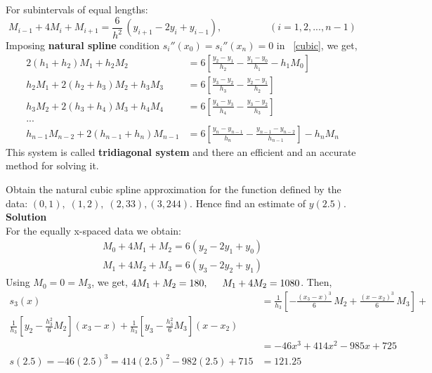 \documentclass[aima203_lecturenotes_ku.tex]{subfiles}
\begin{document}
For subintervals of equal lengths:
\begin{equation}
  M_{i-1} + 4 M_i + M_{i+1} = \frac{6}{h^2}\, (y_{i+1} -2y_i + y_{i-1}), \hspace{2cm} (i=1,2,...,n-1)
\end{equation}
Imposing \textbf{natural spline} condition $s_i''(x_0) = s_i''(x_n) = 0$ in ~\ref{cubic}, we get,
\begin{align*}
  2(h_1+h_2)M_1 + h_2M_2 &= 6 \left[ \frac{y_2 - y_1}{h_2} - \frac{y_1 -y_0}{h_1} - h_1 M_0 \right ]\\[1mm]
  h_2M_1 + 2(h_2 + h_3)M_2 + h_3M_3 &= 6 \left[ \frac{y_3 - y_2}{h_3} - \frac{y_2 -y_1}{h_2}\right ] \\[1mm]
  h_3M_2 + 2(h_3 + h_4)M_3 + h_4M_4 &= 6 \left[ \frac{y_4 - y_3}{h_4} - \frac{y_3 -y_2}{h_3}\right ] \\[1mm]
  ... \\[1mm]
  h_{n-1}M_{n-2} + 2(h_{n-1} + h_n)M_{n-1} &= 6 \left[ \frac{y_n - y_{n-1}}{h_n} - \frac{y_{n-1} -y_{n-2}}{h_{n-1}}\right ] - h_n M_n
\end{align*}
This system is called \textbf{tridiagonal system} and there an efficient and an accurate method for solving it.

\begin{example}
  Obtain the natural cubic spline approximation for the function defined by the data: $(0,1), \; (1,2), \; (2,33), (3,244)$. Hence find an estimate of $y(2.5)$. \\[1mm]
  \textbf{Solution} \\[1mm]
  For the equally x-spaced data we obtain:
  \begin{gather}
    M_0 + 4M_1 + M_2 =6(y_2 -2y_1 + y_0) \\
    M_1 + 4M_2 + M_3 =6(y_3 -2y_2 + y_1)
  \end{gather}
  Using $M_0 = 0 = M_3$, we get, $4M_1 + M_2 = 180, \hspace{5mm} M_1 + 4M_2 = 1080$. Then,
  \begin{align*}
    s_3(x) &= \frac{1}{h_3} \left [ -\frac{(x_3 -x)^3}{6}\, M_2 + \frac{(x-x_2)^3}{6} \, M_3 \right ] + \\
    \frac{1}{h_3}\left [ y_2 -  \frac{h_3^2}{6}M_2 \right ](x_3-x)+ \frac{1}{h_3}\left [ y_3 -  \frac{h_3^2}{6}M_3 \right ](x-x_2) \\
           &=-46x^3+414x^2-985x+725 \\
    s(2.5) = -46(2.5)^3 =414(2.5)^2 -982(2.5) + 715 &= 121.25
  \end{align*}
\end{example}
\end{document}
